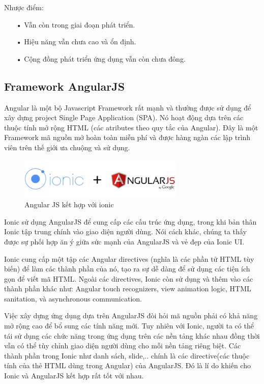 Nhược điểm:


\begin{itemize}
	\item[•] Vẫn còn trong giai đoạn phát triển.
	\item[•] Hiệu năng vẫn chưa cao và ổn định.
	\item[•] Cộng đồng phát triển ứng dụng vẫn còn chưa đông.
\end{itemize}

\subsection{Framework AngularJS}



Angular là một bộ Javascript Framework rất mạnh và thường được sử dụng để xây dựng project Single Page Application (SPA). Nó hoạt động dựa trên các thuộc tính mở rộng HTML (các atributes theo quy tắc của Angular). Đây là một Framework mã nguồn mở hoàn toàn miễn phí và được hàng ngàn các lập trình viên trên thế giới ưa chuộng và sử dụng.

\begin{figure}[H]
	\centering    
	\includegraphics[width=0.7\textwidth]{angularjs}
	\caption[Angular JS kết hợp với ionic ]{Angular JS kết hợp với ionic}
	\label{fig:angularjs}
\end{figure}

Ionic sử dụng AngularJS để cung cấp các cấu trúc ứng dụng, trong khi bản thân Ionic tập trung chính vào giao diện người dùng. Nói cách khác, chúng ta thấy được sự phối hợp ăn ý giữa sức mạnh của AngularJS và vẻ đẹp của Ionic UI.

Ionic cung cấp một tập các Angular directives (nghĩa là các phần tử HTML tùy biến) để làm các thành phần của nó, tạo ra sự dễ dàng để sử dụng các tiện ích gọn để viết mã HTML. Ngoài các directives, Ionic còn sử dụng và thêm vào các thành phần khác như: Angular touch recognizers, view animation logic, HTML sanitation, và asynchronous communication.

Việc xây dựng ứng dụng dựa trên AngularJS đòi hỏi mã nguồn phải có khả năng mở rộng cao để bổ sung các tính năng mới. Tuy nhiên với Ionic, người ta có thể tái sử dụng các chức năng trong ứng dụng trên các nền tảng khác nhau đồng thời vẫn có thể tùy chỉnh giao diện người dùng cho mỗi nền tảng riêng biệt. Các thành phần trong Ionic như danh sách, slide,.. chính là các directive(các thuộc tính của thẻ HTML dùng trong Angular) của AngularJS. Đó là lí do khiến cho Ionic và AngularJS kết hợp rất tốt với nhau.

